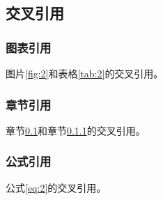 \documentclass[UTF8, zihao = -4, linespread = 1.335, heading = true, fontset = none]{ctexart}
\begin{document}
\subsection{交叉引用}\label{sec:3}
\subsubsection{图表引用}\label{sec:4}
图片\ref{fig:2}和表格\ref{tab:2}的交叉引用。
\subsubsection{章节引用}
章节\ref{sec:3}和章节\ref{sec:4}的交叉引用。
\subsubsection{公式引用}
公式\ref{eq:2}的交叉引用。

\end{document}
